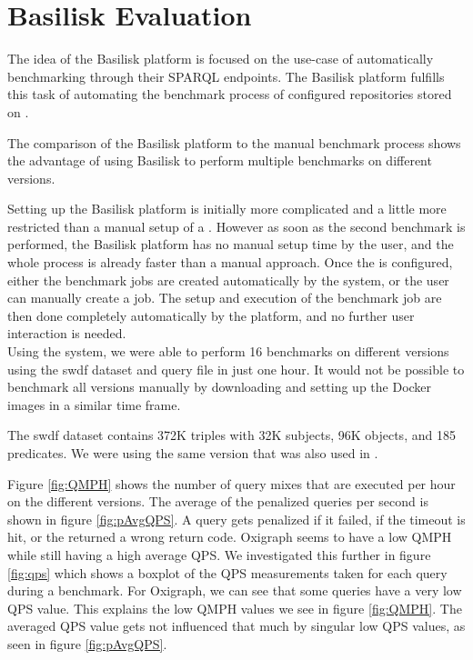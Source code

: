 \section{Basilisk Evaluation}
The idea of the Basilisk platform is focused on the use-case of automatically benchmarking \tsp{} through their SPARQL endpoints.
The Basilisk platform fulfills this task of automating the benchmark process of configured \ts{} repositories stored on \dockh{}.

The comparison of the Basilisk platform to the manual benchmark process shows the advantage of using Basilisk to perform multiple benchmarks on different \ts{} versions.

Setting up the Basilisk platform is initially more complicated and a little more restricted than a manual setup of a \ts{}.
However as soon as the second benchmark is performed, the Basilisk platform has no manual setup time by the user, and the whole process is already faster than a manual approach.
Once the \ts{} is configured, either the benchmark jobs are created automatically by the system, or the user can manually create a job.
The setup and execution of the benchmark job are then done completely automatically by the platform, and no further user interaction is needed.
\\

Using the system, we were able to perform 16 benchmarks on different \tentris{} versions using the \ac{swdf} dataset and query file in just one hour.
It would not be possible to benchmark all versions manually by downloading and setting up the Docker images in a similar time frame.

The \ac{swdf} dataset contains 372K triples with 32K subjects, 96K objects, and 185 predicates.
We were using the same version that was also used in \cite{bigerlTentrisTensorBasedTriple2020}.

Figure \ref{fig:QMPH} shows the number of query mixes that are executed per hour on the different \ts{} versions.
The average of the penalized queries per second is shown in figure \ref{fig:pAvgQPS}.
A query gets penalized if it failed, \eg{} if the timeout is hit, or the \ts{} returned a wrong return code.
Oxigraph seems to have a low \acf{QMPH} while still having a high average \ac{QPS}.
We investigated this further in figure \ref{fig:qps} which shows a boxplot of the \ac{QPS} measurements taken for each query during a benchmark.
For Oxigraph, we can see that some queries have a very low QPS value.
This explains the low \ac{QMPH} values we see in figure \ref{fig:QMPH}.
The averaged \ac{QPS} value gets not influenced that much by singular low \ac{QPS} values, as seen in figure \ref{fig:pAvgQPS}.

